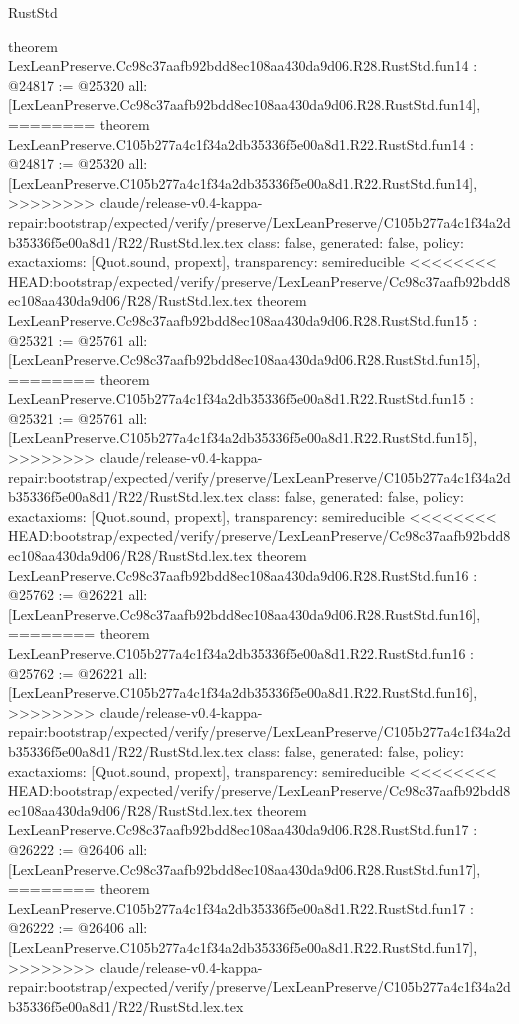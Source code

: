 \begin{lexlean}{RustStd}
\begin{coremodule}
{\begin{coremodule}
{{{{{{{{{{{{{{{{theorem LexLeanPreserve.Cc98c37aafb92bdd8ec108aa430da9d06.R28.RustStd.fun14 : @24817 := @25320 {
  all: [LexLeanPreserve.Cc98c37aafb92bdd8ec108aa430da9d06.R28.RustStd.fun14],
========
theorem LexLeanPreserve.C105b277a4c1f34a2db35336f5e00a8d1.R22.RustStd.fun14 : @24817 := @25320 {
  all: [LexLeanPreserve.C105b277a4c1f34a2db35336f5e00a8d1.R22.RustStd.fun14],
>>>>>>>> claude/release-v0.4-kappa-repair:bootstrap/expected/verify/preserve/LexLeanPreserve/C105b277a4c1f34a2db35336f5e00a8d1/R22/RustStd.lex.tex
  class: false,
  generated: false,
  policy: exact{axioms: [Quot.sound, propext]},
  transparency: semireducible
}
<<<<<<<< HEAD:bootstrap/expected/verify/preserve/LexLeanPreserve/Cc98c37aafb92bdd8ec108aa430da9d06/R28/RustStd.lex.tex
theorem LexLeanPreserve.Cc98c37aafb92bdd8ec108aa430da9d06.R28.RustStd.fun15 : @25321 := @25761 {
  all: [LexLeanPreserve.Cc98c37aafb92bdd8ec108aa430da9d06.R28.RustStd.fun15],
========
theorem LexLeanPreserve.C105b277a4c1f34a2db35336f5e00a8d1.R22.RustStd.fun15 : @25321 := @25761 {
  all: [LexLeanPreserve.C105b277a4c1f34a2db35336f5e00a8d1.R22.RustStd.fun15],
>>>>>>>> claude/release-v0.4-kappa-repair:bootstrap/expected/verify/preserve/LexLeanPreserve/C105b277a4c1f34a2db35336f5e00a8d1/R22/RustStd.lex.tex
  class: false,
  generated: false,
  policy: exact{axioms: [Quot.sound, propext]},
  transparency: semireducible
}
<<<<<<<< HEAD:bootstrap/expected/verify/preserve/LexLeanPreserve/Cc98c37aafb92bdd8ec108aa430da9d06/R28/RustStd.lex.tex
theorem LexLeanPreserve.Cc98c37aafb92bdd8ec108aa430da9d06.R28.RustStd.fun16 : @25762 := @26221 {
  all: [LexLeanPreserve.Cc98c37aafb92bdd8ec108aa430da9d06.R28.RustStd.fun16],
========
theorem LexLeanPreserve.C105b277a4c1f34a2db35336f5e00a8d1.R22.RustStd.fun16 : @25762 := @26221 {
  all: [LexLeanPreserve.C105b277a4c1f34a2db35336f5e00a8d1.R22.RustStd.fun16],
>>>>>>>> claude/release-v0.4-kappa-repair:bootstrap/expected/verify/preserve/LexLeanPreserve/C105b277a4c1f34a2db35336f5e00a8d1/R22/RustStd.lex.tex
  class: false,
  generated: false,
  policy: exact{axioms: [Quot.sound, propext]},
  transparency: semireducible
}
<<<<<<<< HEAD:bootstrap/expected/verify/preserve/LexLeanPreserve/Cc98c37aafb92bdd8ec108aa430da9d06/R28/RustStd.lex.tex
theorem LexLeanPreserve.Cc98c37aafb92bdd8ec108aa430da9d06.R28.RustStd.fun17 : @26222 := @26406 {
  all: [LexLeanPreserve.Cc98c37aafb92bdd8ec108aa430da9d06.R28.RustStd.fun17],
========
theorem LexLeanPreserve.C105b277a4c1f34a2db35336f5e00a8d1.R22.RustStd.fun17 : @26222 := @26406 {
  all: [LexLeanPreserve.C105b277a4c1f34a2db35336f5e00a8d1.R22.RustStd.fun17],
>>>>>>>> claude/release-v0.4-kappa-repair:bootstrap/expected/verify/preserve/LexLeanPreserve/C105b277a4c1f34a2db35336f5e00a8d1/R22/RustStd.lex.tex
}}}}}}}}}}}}}}}}}}}}}
\end{coremodule}}
\end{coremodule}
\end{lexlean}
